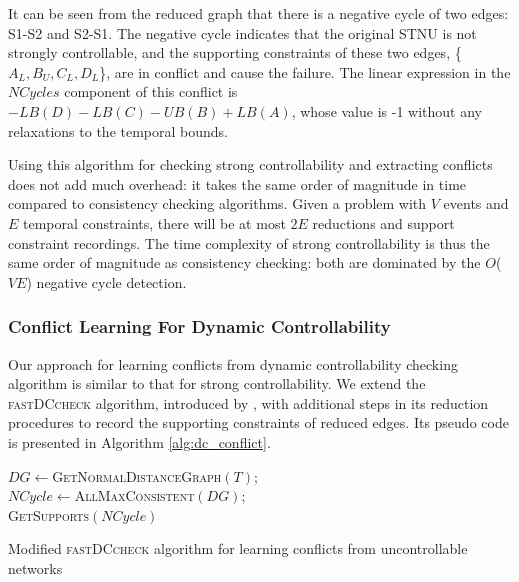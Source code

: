 \documentclass[jair,twoside,11pt,theapa]{article}
\begin{document}
It can be seen from the reduced graph that there is a negative cycle of two
edges: S1-S2 and S2-S1. The negative cycle indicates that the original STNU is
not strongly controllable, and the supporting constraints of these two edges,
\{$A_L,B_U,C_L,D_L$\}, are in conflict and cause the failure. The linear
expression in the $NCycles$ component of this conflict is
$-LB(D)-LB(C)-UB(B)+LB(A)$, whose value is -1 without any relaxations to the
temporal bounds.


Using this algorithm for checking strong controllability and extracting
conflicts does not add much overhead: it takes the same order of magnitude in
time compared to consistency checking algorithms. Given a problem with $V$
events and $E$ temporal constraints, there will be at most $2E$ reductions and support
constraint recordings. The time complexity of strong controllability is thus the
same order of magnitude as consistency checking: both are dominated by the
$O$($VE$) negative cycle detection.


\subsubsection{Conflict Learning For Dynamic Controllability}

Our approach for learning conflicts from dynamic controllability checking
algorithm is similar to that for strong controllability. We extend the
\textsc{fastDCcheck} algorithm, introduced by , with additional
steps in its reduction procedures to record the supporting constraints of reduced
edges. Its pseudo code is presented in Algorithm \ref{alg:dc_conflict}.

\begin{algorithm}[ht!]
	\SetAlgoLined
	\Indm
	\Algorithm{}
	\Indp
	$DG\leftarrow$\textsc{GetNormalDistanceGraph}$(T)$;\\
$NCycle\leftarrow$\textsc{AllMaxConsistent}$(DG)$;\\
\Return \textsc{GetSupports}$(NCycle)$\;
\caption{Modified \textsc{fastDCcheck} algorithm for learning conflicts from uncontrollable networks}
\label{alg:dc_conflict}
\end{algorithm}
\end{document}
